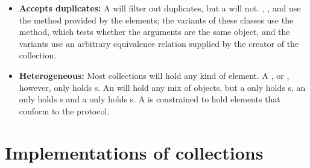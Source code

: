 \documentclass[a4paper,10pt,twoside]{book}
\begin{document}
\begin{itemize}
  \item {\bf Accepts duplicates:}
  	A  will filter out duplicates, but a  will not.
	, , and  use the \ct{=} method provided by the elements; the  variants of these classes use the \ct{==} method, which tests whether the arguments are the same object, and the  variants use an arbitrary equivalence relation supplied by the creator of the collection.

  \item {\bf Heterogeneous:}
  	Most collections will hold any kind of element.
	A ,  or , however, only holds s.
	An  will hold any mix of objects, but a  only holds s, an  only holds s and a  only holds s.
	A  is constrained to hold elements that conform to the  protocol.

\end{itemize}


\section{Implementations of collections}
\label{sec:implementation}
\end{document}
